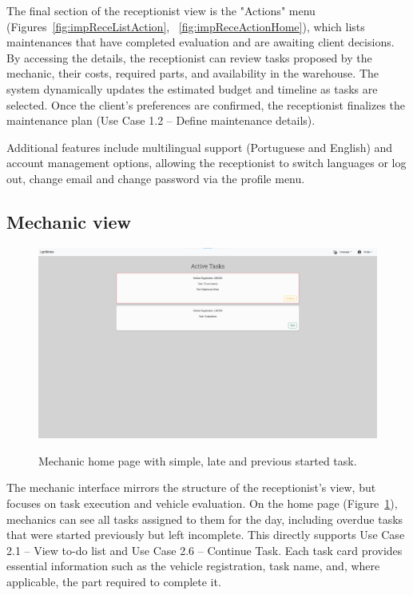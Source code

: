 The final section of the receptionist view is the "Actions" menu (Figures~\ref{fig:impReceListAction}, ~\ref{fig:impReceActionHome}), which lists maintenances that have completed evaluation and are awaiting client decisions. By accessing the details, the receptionist can review tasks proposed by the mechanic, their costs, required parts, and availability in the warehouse. The system dynamically updates the estimated budget and timeline as tasks are selected. Once the client's preferences are confirmed, the receptionist finalizes the maintenance plan (Use Case 1.2 – Define maintenance details).



Additional features include multilingual support (Portuguese and English) and account management options, allowing the receptionist to switch languages or log out, change email and change password via the profile menu.


\subsection{Mechanic view}


\begin{figure}[h]
  \caption{Mechanic home page with simple, late and previous started task.}
  \centering
  \includegraphics[width=\textwidth]{figs/Implementation/mechanic/HomeShowTasks}
  \label{fig:HomeShowTasks}
\end{figure}





The mechanic interface mirrors the structure of the receptionist's view, but focuses on task execution and vehicle evaluation. On the home page (Figure~\ref{fig:HomeShowTasks}), mechanics can see all tasks assigned to them for the day, including overdue tasks that were started previously but left incomplete. This directly supports Use Case 2.1 – View to-do list and Use Case 2.6 – Continue Task. Each task card provides essential information such as the vehicle registration, task name, and, where applicable, the part required to complete it.



